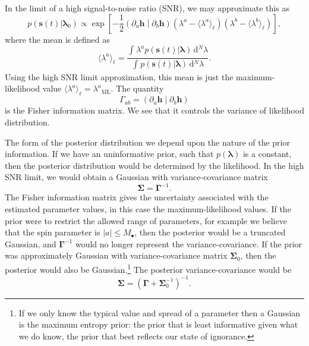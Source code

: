 \documentclass[a4paper, 11pt, titlepage, twoside]{report}
\newcommand{\sub}[1]{\ensuremath{_\mathrm{#1}}}
\newcommand{\recip}[1]{\ensuremath{\frac{1}{#1}}}
\newcommand{\innerprod}[2]{\ensuremath{\left({#1}\middle|{#2}\right)}}
\newcommand{\dd}{\ensuremath{\mathrm{d}}}
\newcommand{\intd}[4]{\ensuremath{\int_{#1}^{#2}{#3}\,\dd{#4}}}
\begin{document}
{In the limit of a high signal-to-noise ratio (SNR), we may approximate this as\cite{Vallisneri2008}
\begin{equation}
p(\boldsymbol{s}(t)|\boldsymbol{\lambda}_0) \propto \exp\left[-\recip{2}\innerprod{\partial_a\boldsymbol{h}}{\partial_b\boldsymbol{h}}\left(\lambda^a - \langle\lambda^a\rangle_\ell\right)\left(\lambda^b - \langle\lambda^b\rangle_\ell\right)\right],
\end{equation}
where the mean is defined as
\begin{equation}
\langle\lambda^a\rangle_\ell = \frac{\intd{}{}{\lambda^a p(\boldsymbol{s}(t)|\boldsymbol{\lambda})}{^N \lambda}}{\intd{}{}{p(\boldsymbol{s}(t)|\boldsymbol{\lambda})}{^N \lambda}}.
\end{equation}
Using the high SNR limit approximation, this mean is just the maximum-likelihood value $\langle\lambda^a\rangle_\ell = \lambda^a\sub{ML}$. The quantity
\begin{equation}
\Gamma_{ab} = \innerprod{\partial_a\boldsymbol{h}}{\partial_b\boldsymbol{h}}
\end{equation}
is the Fisher information matrix. We see that it controls the variance of likelihood distribution.

The form of the posterior distribution we depend upon the nature of the prior information. If we have an uninformative prior, such that $p(\boldsymbol{\lambda})$ is a constant, then the posterior distribution would be determined by the likelihood. In the high SNR limit, we would obtain a Gaussian with variance-covariance matrix
\begin{equation}
\boldsymbol{\Sigma} = \boldsymbol{\Gamma}^{-1}.
\end{equation}
The Fisher information matrix gives the uncertainty associated with the estimated parameter values, in this case the maximum-likelihood values. If the prior were to restrict the allowed range of parameters, for example we believe that the spin parameter is $|a| \leq M_\bullet$, then the posterior would be a truncated Gaussian, and $\boldsymbol{\Gamma}^{-1}$ would no longer represent the variance-covariance. If the prior was approximately Gaussian with variance-covariance matrix $\boldsymbol{\Sigma}_0$, then the posterior would also be Gaussian.\footnote{If we only know the typical value and spread of a parameter then a Gaussian is the maximum entropy prior\cite{Jaynes2003}: the prior that is least informative given what we do know, the prior that best reflects our state of ignorance.} The posterior variance-covariance would be\cite{Cutler1994, Vallisneri2008}
\begin{equation}
\boldsymbol{\Sigma} = \left(\boldsymbol{\Gamma} + \boldsymbol{\Sigma}_0^{-1}\right)^{-1}.
\end{equation}

}
\end{document}
